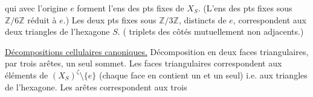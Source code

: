 
qui avec l'origine $e$ forment l'ens des pts fixes de $X_S$. (L'ens des pts fixes sous $\mathbb Z/6\mathbb Z$  réduit à $e$.) Les deux pts fixes sous $\mathbb Z/3\mathbb Z$, distincts de $e$, correspondent aux deux triangles  de l'hexagone $S$. ( triplets des côtés mutuellement non adjacents.)

\uline{Décompositions cellulaires canoniques.} Décomposition en deux faces triangulaires, par trois arêtes, un seul sommet. Les faces triangulaires correspondent aux éléments de $(X_S)^\zeta\setminus\{e\}$ (chaque face en contient un et un seul) i.e. aux triangles  de l'hexagone. Les arêtes correspondent aux trois

